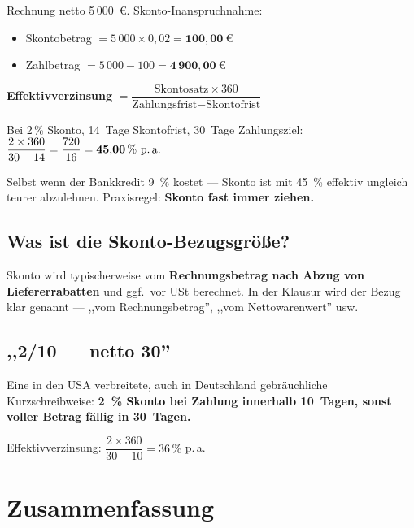\documentclass[11pt, a4paper]{article}
\begin{document}
\begin{beispiel}
Rechnung netto 5\,000~€. Skonto-Inanspruchnahme:
\begin{itemize}[itemsep=0pt]
  \item Skontobetrag $= 5\,000 \times 0{,}02 = \mathbf{100{,}00~€}$
  \item Zahlbetrag $= 5\,000 - 100 = \mathbf{4\,900{,}00~€}$
\end{itemize}
\end{beispiel}

\begin{merksatz}[title={Effektivverzinsung der Skonto-Inanspruchnahme}]
\textbf{Effektivverzinsung} $= \dfrac{\text{Skontosatz} \times 360}{\text{Zahlungsfrist} - \text{Skontofrist}}$
\end{merksatz}

\begin{beispiel}
Bei 2\,\% Skonto, 14~Tage Skontofrist, 30~Tage Zahlungsziel:
$\dfrac{2 \times 360}{30 - 14} = \dfrac{720}{16} = \mathbf{45{,}00\,\%~\text{p.\,a.}}$

Selbst wenn der Bankkredit 9~\% kostet --- Skonto ist mit 45~\% effektiv ungleich
teurer abzulehnen. Praxisregel: \textbf{Skonto fast immer ziehen.}
\end{beispiel}

\subsection{Was ist die Skonto-Bezugsgröße?}

Skonto wird typischerweise vom \textbf{Rechnungsbetrag nach Abzug von Liefererrabatten}
und ggf.\ vor USt berechnet. In der Klausur wird der Bezug klar genannt --- ,,vom
Rechnungsbetrag'', ,,vom Nettowarenwert'' usw.

\subsection{,,2/10 --- netto 30''}

Eine in den USA verbreitete, auch in Deutschland gebräuchliche Kurzschreibweise:
\textbf{2~\% Skonto bei Zahlung innerhalb 10~Tagen, sonst voller Betrag fällig in 30~Tagen.}

Effektivverzinsung: $\dfrac{2 \times 360}{30 - 10} = 36\,\%$ p.\,a.

\section{Zusammenfassung}
\end{document}

